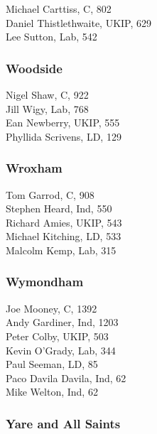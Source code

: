 \documentclass[a4paper,openany,10pt]{book}
\begin{document}


Michael Carttiss, C, 802\\
Daniel Thistlethwaite, UKIP, 629\\
Lee Sutton, Lab, 542\\


\subsubsection*{Woodside}



Nigel Shaw, C, 922\\
Jill Wigy, Lab, 768\\
Ean Newberry, UKIP, 555\\
Phyllida Scrivens, LD, 129\\


\subsubsection*{Wroxham}



Tom Garrod, C, 908\\
Stephen Heard, Ind, 550\\
Richard Amies, UKIP, 543\\
Michael Kitching, LD, 533\\
Malcolm Kemp, Lab, 315\\


\subsubsection*{Wymondham}



Joe Mooney, C, 1392\\
Andy Gardiner, Ind, 1203\\
Peter Colby, UKIP, 503\\
Kevin O'Grady, Lab, 344\\
Paul Seeman, LD, 85\\
Paco Davila Davila, Ind, 62\\
Mike Welton, Ind, 62\\


\subsubsection*{Yare and All Saints}
\end{document}
